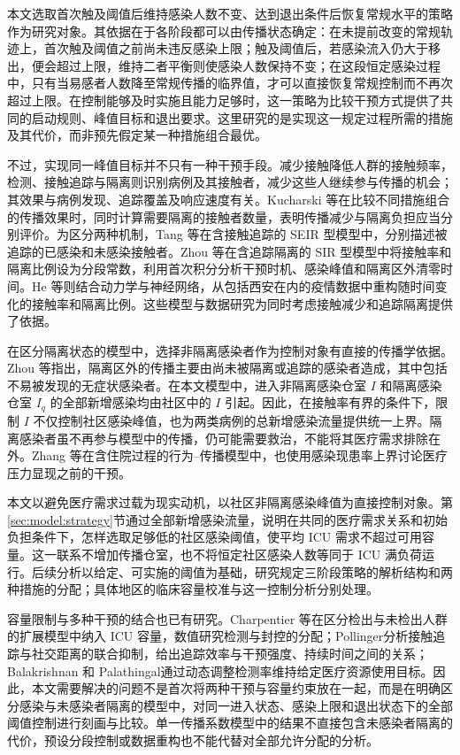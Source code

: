 \documentclass[lang=cn,a4paper,newtx]{elegantpaper}
\numberwithin{equation}{section}
\theoremstyle{plain}
\begin{document}
本文选取首次触及阈值后维持感染人数不变、达到退出条件后恢复常规水平的策略作为研究对象。其依据在于各阶段都可以由传播状态确定：在未提前改变的常规轨迹上，首次触及阈值之前尚未违反感染上限；触及阈值后，若感染流入仍大于移出，便会超过上限，维持二者平衡则使感染人数保持不变；在这段恒定感染过程中，只有当易感者人数降至常规传播的临界值，才可以直接恢复常规控制而不再次超过上限。在控制能够及时实施且能力足够时，这一策略为比较干预方式提供了共同的启动规则、峰值目标和退出要求。这里研究的是实现这一规定过程所需的措施及其代价，而非预先假定某一种措施组合最优。

不过，实现同一峰值目标并不只有一种干预手段。减少接触降低人群的接触频率，检测、接触追踪与隔离则识别病例及其接触者，减少这些人继续参与传播的机会；其效果与病例发现、追踪覆盖及响应速度有关\cite{Hellewell2020,Ferretti2020}。Kucharski 等\cite{Kucharski2020}在比较不同措施组合的传播效果时，同时计算需要隔离的接触者数量，表明传播减少与隔离负担应当分别评价。为区分两种机制，Tang 等\cite{Tang2020Transmission}在含接触追踪的 SEIR 型模型中，分别描述被追踪的已感染和未感染接触者。Zhou 等\cite{Zhou2024SPCI}在含追踪隔离的 SIR 型模型中将接触率和隔离比例设为分段常数，利用首次积分分析干预时机、感染峰值和隔离区外清零时间。He 等\cite{He2023TDINN}则结合动力学与神经网络，从包括西安在内的疫情数据中重构随时间变化的接触率和隔离比例。这些模型与数据研究为同时考虑接触减少和追踪隔离提供了依据。

在区分隔离状态的模型中，选择非隔离感染者作为控制对象有直接的传播学依据。Zhou 等\cite{Zhou2024SPCI}指出，隔离区外的传播主要由尚未被隔离或追踪的感染者造成，其中包括不易被发现的无症状感染者。在本文模型中，进入非隔离感染仓室 $I$ 和隔离感染仓室 $I_q$ 的全部新增感染均由社区中的 $I$ 引起。因此，在接触率有界的条件下，限制 $I$ 不仅控制社区感染峰值，也为两类病例的总新增感染流量提供统一上界。隔离感染者虽不再参与模型中的传播，仍可能需要救治，不能将其医疗需求排除在外。Zhang 等\cite{Zhang2026Behavior}在含住院过程的行为--传播模型中，也使用感染现患率上界讨论医疗压力显现之前的干预。

本文以避免医疗需求过载为现实动机，以社区非隔离感染峰值为直接控制对象。第\ref{sec:model:strategy}节通过全部新增感染流量，说明在共同的医疗需求关系和初始负担条件下，怎样选取足够低的社区感染阈值，使平均 ICU 需求不超过可用容量。这一联系不增加传播仓室，也不将恒定社区感染人数等同于 ICU 满负荷运行。后续分析以给定、可实施的阈值为基础，研究规定三阶段策略的解析结构和两种措施的分配；具体地区的临床容量校准与这一控制分析分别处理。

容量限制与多种干预的结合也已有研究。Charpentier 等\cite{Charpentier2020}在区分检出与未检出人群的扩展模型中纳入 ICU 容量，数值研究检测与封控的分配；Pollinger\cite{Pollinger2023}分析接触追踪与社交距离的联合抑制，给出追踪效率与干预强度、持续时间之间的关系；Balakrishnan 和 Palathingal\cite{Balakrishnan2023}通过动态调整检测率维持给定医疗资源使用目标。因此，本文需要解决的问题不是首次将两种干预与容量约束放在一起，而是在明确区分感染与未感染者隔离的模型中，对同一进入状态、感染上限和退出状态下的全部阈值控制进行刻画与比较。单一传播系数模型中的结果不直接包含未感染者隔离的代价，预设分段控制或数据重构也不能代替对全部允许分配的分析。
\end{document}
